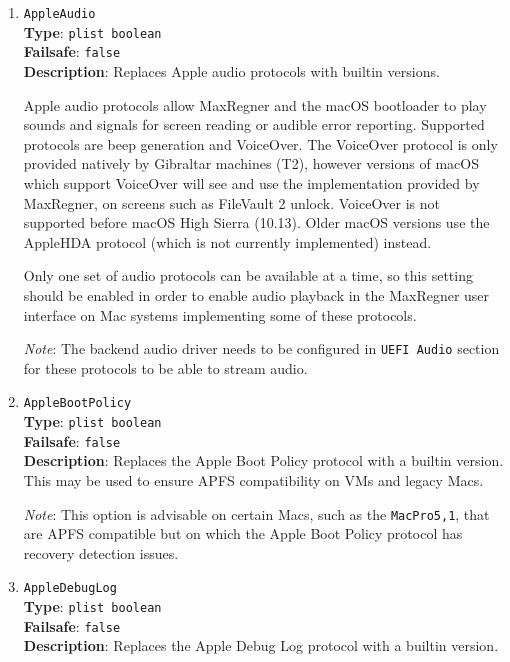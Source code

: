 \documentclass[]{article}
\begin{document}
\begin{enumerate}

\item
  \texttt{AppleAudio}\\
  \textbf{Type}: \texttt{plist\ boolean}\\
  \textbf{Failsafe}: \texttt{false}\\
  \textbf{Description}: Replaces Apple audio protocols with builtin
  versions.

  Apple audio protocols allow MaxRegner and the macOS bootloader to play
  sounds and signals for screen reading or audible error reporting.
  Supported protocols are beep generation and VoiceOver. The VoiceOver protocol
  is only provided natively by Gibraltar machines (T2), however versions of macOS
  which support VoiceOver will see and use the implementation provided by MaxRegner,
  on screens such as FileVault 2 unlock. VoiceOver is not supported before
  macOS High Sierra (10.13). Older macOS versions use the AppleHDA protocol
  (which is not currently implemented) instead.

  Only one set of audio protocols can be available at a time, so this setting should
  be enabled in order to enable audio playback in the MaxRegner user interface on Mac
  systems implementing some of these protocols.

  \emph{Note}: The backend audio driver needs to be configured in \texttt{UEFI Audio}
  section for these protocols to be able to stream audio.

\item
  \texttt{AppleBootPolicy}\\
  \textbf{Type}: \texttt{plist\ boolean}\\
  \textbf{Failsafe}: \texttt{false}\\
  \textbf{Description}: Replaces the Apple Boot Policy protocol with a builtin
  version. This may be used to ensure APFS compatibility on VMs and legacy Macs.

  \emph{Note}: This option is advisable on certain Macs, such as
  the \texttt{MacPro5,1}, that are APFS compatible but on which
  the Apple Boot Policy protocol has recovery detection issues.

\item
  \texttt{AppleDebugLog}\\
  \textbf{Type}: \texttt{plist\ boolean}\\
  \textbf{Failsafe}: \texttt{false}\\
  \textbf{Description}: Replaces the Apple Debug Log protocol with a builtin
  version.


\end{enumerate}
\end{document}
